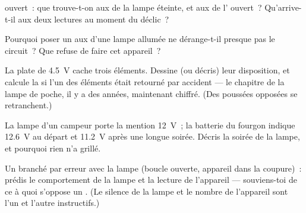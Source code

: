 \begin{exercise}[$\star$]\label{exo:g8:voltage-voltmeter:7}
 ouvert~: que trouve-t-on aux  de la lampe éteinte,
et aux  de l' ouvert~? Qu'arrive-t-il aux deux
lectures au moment du déclic~?
\end{exercise}

\begin{exercise}[$\star$]\label{exo:g8:voltage-voltmeter:8}
Pourquoi poser un  aux  d'une lampe allumée ne
dérange-t-il presque pas le circuit~? Que refuse de faire cet
appareil~?
\end{exercise}

\begin{exercise}[$\star\star$]\label{exo:g8:voltage-voltmeter:9}
La  plate de \qty{4.5}{V} cache trois éléments. Dessine (ou
décris) leur disposition, et calcule la  si l'un des éléments
était retourné par accident --- le chapitre de la lampe de poche,
il y a des années, maintenant chiffré. (Des poussées opposées se
retranchent.)
\end{exercise}

\begin{exercise}[$\star\star$]\label{exo:g8:voltage-voltmeter:10}
La lampe d'un campeur porte la mention \qty{12}{V}~; la batterie du
fourgon indique \qty{12.6}{V} au départ et \qty{11.2}{V} après une
longue soirée. Décris la soirée de la lampe, et pourquoi rien n'a
grillé.
\end{exercise}

\begin{exercise}[$\star\star$]\label{exo:g8:voltage-voltmeter:11}
Un  branché par erreur \emph{} avec la lampe (boucle
ouverte, appareil dans la coupure)~: prédis le comportement de la
lampe et la lecture de l'appareil --- souviens-toi de ce à quoi
s'oppose un . (Le silence de la lampe et le nombre de
l'appareil sont l'un et l'autre instructifs.)
\end{exercise}

